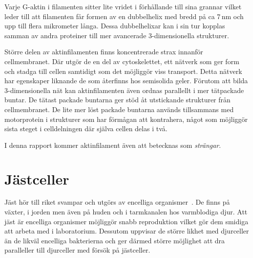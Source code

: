 Varje G-aktin i filamenten sitter lite vridet i förhållande till sina grannar vilket leder till att filamenten får formen av en dubbelhelix med bredd på ca 7\,nm och upp till flera mikrometer långa. Dessa dubbelhelixar kan i sin tur kopplas samman av andra proteiner till mer avancerade 3-dimensionella strukturer.

Större delen av aktinfilamenten finns koncentrerade strax innanför cellmembranet. Där utgör de en del av cytoskelettet, ett nätverk som ger form och stadga till cellen samtidigt som det möjliggör viss transport. Detta nätverk har egenskaper liknande de som återfinns hos semisolida geler. Förutom att bilda 3-dimensionella nät kan aktinfilamenten även ordnas parallellt i mer tätpackade buntar. De tätast packade buntarna ger stöd åt utstickande strukturer från cellmembranet. De lite mer löst packade buntarna används tillsammans med motorprotein i strukturer som har förmågan att kontrahera, något som möjliggör sista steget i celldelningen där själva cellen delas i två. 

I denna rapport kommer aktinfilament även att betecknas som \emph{strängar}.



\section{Jästceller}

Jäst hör till riket svampar och utgörs av encelliga organismer~\cite{SGD_yeast}.
De finns på växter, i jorden men även på huden och i tarmkanalen hos varmblodiga djur. 
Att jäst är encelliga organismer möjliggör snabb reproduktion vilket gör dem smidiga att arbeta med i laboratorium. Dessutom uppvisar de större likhet med djurceller än de likväl encelliga bakterierna och ger därmed större möjlighet att dra paralleller till djurceller med försök på jästceller. 

